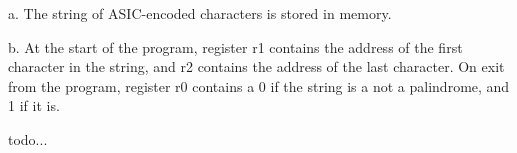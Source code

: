 \documentclass[letterpaper,12pt,titlepage]{article}
\begin{document}
a. The string of ASIC-encoded characters is stored in memory.

b. At the start of the program, register r1 contains the address of the first character in the string, and r2 contains the address of the last character. On exit from the program, register r0 contains a 0 if the string is a not a palindrome, and 1 if it is.

\begin{mdframed}[style=MyFrame]
todo...
\end{mdframed}



\end{document}
